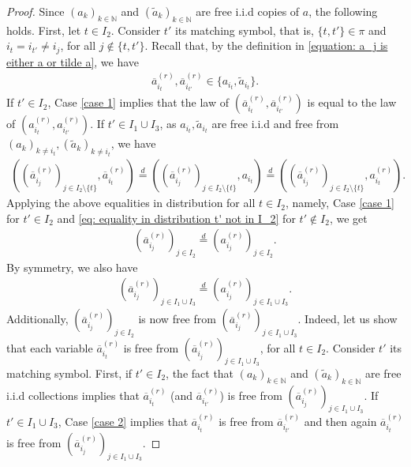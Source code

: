 \documentclass[10pt,a4paper]{amsart}
\newcommand{\N}{\mathbb{N}}
\begin{document}
\begin{proof}
    Since $(a_k)_{k \in \N}$ and $(\tilde{a}_k)_{k \in \N}$ are free i.i.d copies of $a$, the following holds. First, let $t \in I_2$. Consider $t'$ its matching symbol, that is, $\{t,t'\} \in \pi$ and $i_t=i_{t'} \ne i_j$, for all $j \notin \{t,t'\}$. Recall that, by the definition in \eqref{equation: a_j is either a or tilde a}, we have
    \begin{align*}
        \overline{a}_{i_t}^{(r)},\overline{a}_{i_{t'}}^{(r)} \in \{a_{i_t},\tilde{a}_{i_t}\}.
    \end{align*}
    If $t' \in I_2$, Case \eqref{case 1} implies that the law of $(\overline{a}_{i_t}^{(r)},\overline{a}_{i_{t'}}^{(r)})$ is equal to the law of $({a}_{i_t}^{(r)},{a}_{i_{t'}}^{(r)})$. If $t' \in I_1\cup I_3$, as $a_{i_t},\tilde{a}_{i_t}$ are free i.i.d and free from $(a_k)_{k \ne i_t},(\tilde{a}_k)_{k \ne i_t}$, we have
    \begin{align}\label{eq: equality in distribution t' not in I_2}
        \left((\overline{a}_{i_j}^{(r)})_{j \in I_2\setminus\{t\}},\overline{a}_{i_t}^{(r)}\right)\overset{d}{=}\left((\overline{a}^{(r)}_{i_j})_{j \in I_2\setminus\{t\}},a_{i_t}\right)\overset{d}{=}\left((\overline{a}^{(r)}_{i_j})_{j \in I_2\setminus\{t\}},a_{i_t}^{(r)}\right).
    \end{align}
    Applying the above equalities in distribution for all $t \in I_2$, namely, Case \eqref{case 1} for $t' \in I_2$ and \eqref{eq: equality in distribution t' not in I_2} for $t' \notin I_2$, we get
    \begin{align*}
        \left(\overline{a}_{i_j}^{(r)}\right)_{j \in I_2}\overset{d}{=}\left(a_{i_j}^{(r)}\right)_{j \in I_2}.
    \end{align*}
    By symmetry, we also have
    \begin{align*}
        \left(\overline{a}_{i_j}^{(r)}\right)_{j \in I_1\cup I_3}\overset{d}{=}\left(a_{i_j}^{(r)}\right)_{j \in I_1\cup I_3}.
    \end{align*}
    Additionally, $\left(\overline{a}_{i_j}^{(r)}\right)_{j \in I_2}$ is now free from $\left(\overline{a}_{i_j}^{(r)}\right)_{j \in I_1\cup I_3}$. Indeed, let us show that each variable $\overline{a}_{i_t}^{(r)}$ is free from $\left(\overline{a}_{i_j}^{(r)}\right)_{j \in I_1\cup I_3}$, for all $t \in I_2$. Consider $t'$ its matching symbol. First, if $t' \in I_2$, the fact that $(a_k)_{k \in \N}$ and $(\tilde{a}_k)_{k \in \N}$ are free i.i.d collections implies that $\overline{a}_{i_t}^{(r)}$ (and $\overline{a}_{i_{t'}}^{(r)}$) is free from $\left(\overline{a}_{i_j}^{(r)}\right)_{j \in I_1\cup I_3}$. If $t' \in I_1\cup I_3$, Case \eqref{case 2} implies that $\overline{a}_{i_t}^{(r)}$ is free from $\overline{a}_{i_{t'}}^{(r)}$ and then again $\overline{a}_{i_t}^{(r)}$ is free from $\left(\overline{a}_{i_j}^{(r)}\right)_{j \in I_1\cup I_3}$. 
    

\end{proof}
\end{document}

